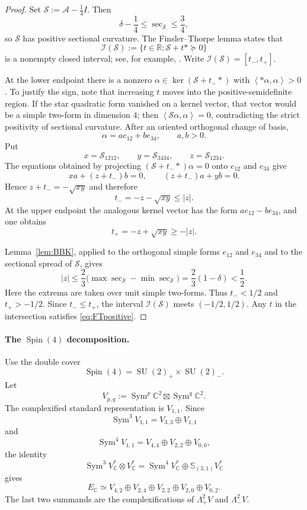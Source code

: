 \documentclass[reqno,11pt]{amsart}
\theoremstyle{definition}
\newcommand{\cA}{\mathcal A}
\newcommand{\Sym}{\operatorname{Sym}}
\newcommand{\Spin}{\operatorname{Spin}}
\newcommand{\SU}{\operatorname{SU}}
\newcommand{\bbR}{\mathbb R}
\newcommand{\bbC}{\mathbb C}
\newcommand{\cS}{\mathcal S}
\newcommand{\Hook}{\mathbb S_{(3,1)}}
\newcommand{\inner}[2]{\left\langle #1,#2\right\rangle}
\begin{document}
\begin{proof}
Set $\cS:=\cA-\frac14I$. Then
$$
  \delta-\frac14\leq\sec_{\cS}\leq\frac34,
$$
so $\cS$ has positive sectional curvature. The Finsler--Thorpe lemma states that
$$
  \mathcal I(\cS):=\{t\in\bbR:\cS+t*\succeq0\}
$$
is a nonempty closed interval; see, for example,
\cite[Section~2]{BettiolGoodman24}. Write $\mathcal I(\cS)=[t_-,t_+]$.

At the lower endpoint there is a nonzero
$\alpha\in\ker(\cS+t_-*)$ with $\inner{*\alpha}{\alpha}>0$. To justify the sign,
note that increasing $t$ moves into the positive-semidefinite region. If the
star quadratic form vanished on a kernel vector, that vector would be a
simple two-form in dimension $4$; then
$\inner{\cS\alpha}{\alpha}=0$, contradicting the strict positivity of sectional
curvature. After an oriented orthogonal change of basis,
$$
  \alpha=a e_{12}+b e_{34},
  \qquad a,b>0.
$$
Put
$$
  x=\cS_{1212},\qquad y=\cS_{3434},\qquad z=\cS_{1234}.
$$
The equations obtained by projecting $(\cS+t_-*)\alpha=0$ onto
$e_{12}$ and $e_{34}$ give
$$
  xa+(z+t_-)b=0,
  \qquad
  (z+t_-)a+yb=0.
$$
Hence $z+t_-=-\sqrt{xy}$ and therefore
$$
  t_-=-z-\sqrt{xy}\leq|z|.
$$
At the upper endpoint the analogous kernel vector has the form
$a e_{12}-b e_{34}$, and one obtains
$$
  t_+=-z+\sqrt{xy}\geq-|z|.
$$

Lemma~\ref{lem:BBK}, applied to the orthogonal simple forms
$e_{12}$ and $e_{34}$ and to the sectional spread of $\cS$, gives
$$
  |z|
  \leq\frac23\bigl(\max\sec_{\cS}-\min\sec_{\cS}\bigr)
  =\frac23(1-\delta)<\frac12.
$$
Here the extrema are taken over unit simple two-forms.
Thus $t_-<1/2$ and $t_+>-1/2$. Since $t_-\leq t_+$, the interval
$\mathcal I(\cS)$ meets $(-1/2,1/2)$. Any $t$ in the intersection satisfies
\eqref{eq:FTpositive}.
\end{proof}

\paragraph{The \texorpdfstring{$\Spin(4)$}{Spin(4)} decomposition.}

Use the double cover
$$
  \Spin(4)=\SU(2)_+\times\SU(2)_-.
$$
Let
$$
  V_{p,q}:=\Sym^p\bbC^2\boxtimes\Sym^q\bbC^2.
$$
The complexified standard representation is $V_{1,1}$. Since
$$
  \Sym^3V_{1,1}=V_{3,3}\oplus V_{1,1}
$$
and
$$
  \Sym^4V_{1,1}=V_{4,4}\oplus V_{2,2}\oplus V_{0,0},
$$
the identity
$$
  \Sym^3V_\bbC^*\otimes V_\bbC^*
  =\Sym^4V_\bbC^*\oplus\Hook V_\bbC^*
$$
gives
\begin{equation}\label{eq:spin-decomposition}
  E_\bbC
  \simeq
  V_{4,2}\oplus V_{2,4}\oplus V_{2,2}
  \oplus V_{2,0}\oplus V_{0,2}.
\end{equation}
The last two summands are the complexifications of
$\Lambda^2_+V$ and $\Lambda^2_-V$.
\end{document}
